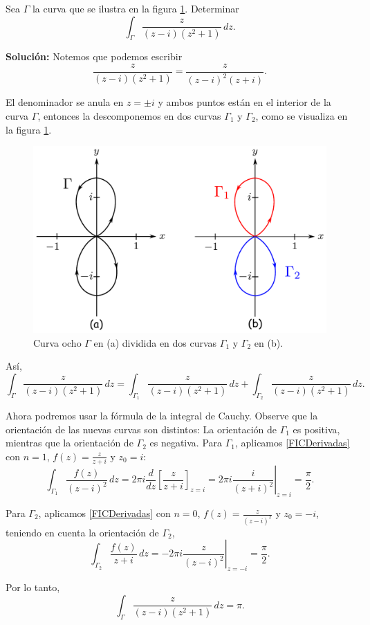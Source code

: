 \begin{ejemplo}
Sea $\Gamma$ la curva que se ilustra en la figura \ref{fig:EjemploFIC}. Determinar
    $$\int_{\Gamma} \frac{z}{(z-i)(z^2+1)} \,dz.$$
    
\textbf{Solución:}  Notemos que podemos escribir
$$ \frac{z}{(z-i)(z^2+1)} = \frac{z}{(z-i)^2(z+i)}.$$

El denominador se anula en $z = \pm i$ y ambos puntos están en el interior de la curva $\Gamma$, entonces la descomponemos en dos curvas $\Gamma_1$ y $\Gamma_2$, como se visualiza en la figura \ref{fig:EjemploFIC}.
\begin{figure}[H]
    \centering
    \includegraphics[scale = 0.5]{Figuras/Ejemplo_FIC.pdf}
    \caption{Curva ocho $\Gamma$ en (a) dividida en dos curvas $\Gamma_1$ y $\Gamma_2$ en (b).}
    \label{fig:EjemploFIC}
\end{figure}

Así, 
$$\int_{\Gamma} \frac{z}{(z-i)(z^2+1)} \,dz = \int_{\Gamma_1} \frac{z}{(z-i)(z^2+1)} \,dz + \int_{\Gamma_2} \frac{z}{(z-i)(z^2+1)} \,dz.$$

Ahora podremos usar la fórmula de la integral de Cauchy. Observe que la orientación de las nuevas curvas son distintos: La orientación de $\Gamma_1$ es positiva, mientras que la orientación de $\Gamma_2$ es negativa. Para $\Gamma_1$, aplicamos \ref{FICDerivadas} con $n = 1$, $f(z) = \frac{z}{z+i}$ y $z_0 =i$:
$$\int_{\Gamma_1} \frac{f(z)}{(z-i)^2} \,dz = 2\pi i \frac{d}{dz}\left[ \frac{z}{z+i} \right]_{z=i} = \left. 2\pi i \frac{i}{(z+i)^2} \right|_{z=i} = \frac{\pi}{2}.$$

Para $\Gamma_2$,  aplicamos \ref{FICDerivadas} con $n = 0$, $f(z) = \frac{z}{(z-i)^2}$ y $z_0 = -i$, teniendo en cuenta la orientación de $\Gamma_2$,
$$\int_{\Gamma_2} \frac{f(z)}{z+i} \,dz = \left. - 2\pi i  \frac{z}{(z-i)^2} \right|_{z=-i} = \frac{\pi}{2}.$$

Por lo tanto,
$$\int_{\Gamma} \frac{z}{(z-i)(z^2+1)} \,dz = \pi.$$
\end{ejemplo}

